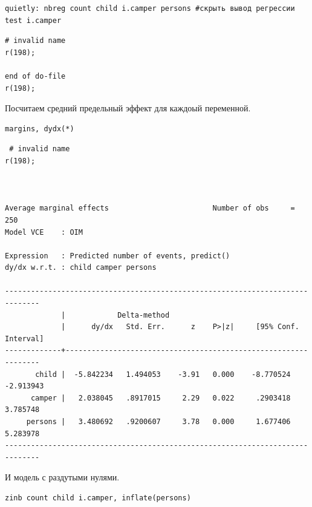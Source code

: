 \documentclass[]{book}
\begin{document}
\begin{verbatim}
quietly: nbreg count child i.camper persons #скрыть вывод регрессии
test i.camper 
\end{verbatim}

\begin{verbatim}
# invalid name
r(198);

end of do-file
r(198);
\end{verbatim}

Посчитаем средний предельный эффект для каждоый переменной.

\begin{verbatim}
margins, dydx(*)
\end{verbatim}

\begin{verbatim}
 # invalid name
r(198);



Average marginal effects                        Number of obs     =        250
Model VCE    : OIM

Expression   : Predicted number of events, predict()
dy/dx w.r.t. : child camper persons

------------------------------------------------------------------------------
             |            Delta-method
             |      dy/dx   Std. Err.      z    P>|z|     [95% Conf. Interval]
-------------+----------------------------------------------------------------
       child |  -5.842234   1.494053    -3.91   0.000    -8.770524   -2.913943
      camper |   2.038045   .8917015     2.29   0.022     .2903418    3.785748
     persons |   3.480692   .9200607     3.78   0.000     1.677406    5.283978
------------------------------------------------------------------------------
\end{verbatim}

И модель с раздутыми нулями.

\begin{verbatim}
zinb count child i.camper, inflate(persons)
\end{verbatim}
\end{document}
